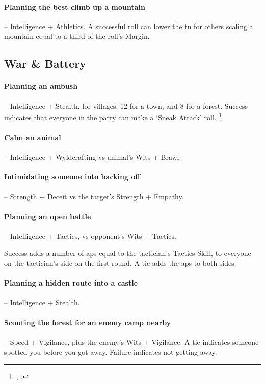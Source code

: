 \begin{multicols}{2}
\paragraph{Planning the best climb up a mountain} -- Intelligence + Athletics.
A successful roll can lower the \gls{tn} for others scaling a mountain equal to a third of the roll's Margin.

\subsection{War \& Battery}

\paragraph{Planning an ambush} -- Intelligence + Stealth,  for villages, 12 for a town, and 8 for a forest.
Success indicates that everyone in the party can make a `Sneak Attack' roll.%
\footnote{, .}

\paragraph{Calm an animal} -- Intelligence + Wyldcrafting vs animal's Wits + Brawl.

\paragraph{Intimidating someone into backing off} -- Strength + Deceit vs the target's Strength + Empathy.

\paragraph{Planning an open battle} -- Intelligence + Tactics,  vs opponent's Wits + Tactics.

Success adds a number of \glspl{ap} equal to the tactician's Tactics Skill, to everyone on the tactician's side on the first round.
A tie adds the \glspl{ap} to both sides.

\paragraph{Planning a hidden route into a castle} -- Intelligence + Stealth.

\paragraph{Scouting the forest for an enemy camp nearby} -- Speed + Vigilance,  plus the enemy's Wits + Vigilance.
A tie indicates someone spotted you before you got away.
Failure indicates not getting away.

\end{multicols}

